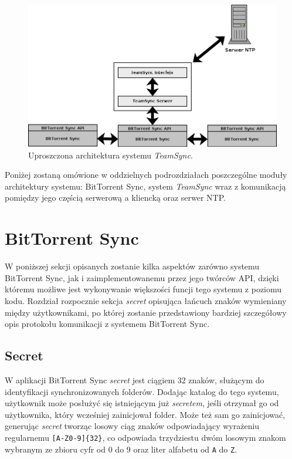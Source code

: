 \documentclass[polish,a4paper,twoside]{ppfcmthesis}
\begin{document}
\begin{figure}[htb]
  \vspace{5pt}
  \begin{center}
    \includegraphics[width=380pt]{figures/architecture3.png}
  \end{center}
  \caption{Uproszczona architektura systemu \emph{TeamSync}.}
  \label{architecturepic}
\end{figure}

Poniżej zostaną omówione w oddzielnych podrozdziałach poszczególne moduły architektury systemu: BitTorrent Sync, system \emph{TeamSync} wraz z komunikacją pomiędzy jego częścią serwerową a kliencką oraz serwer NTP.

\section{BitTorrent Sync}

W poniższej sekcji opisanych zostanie kilka aspektów zarówno systemu BitTorrent Sync, jak i zaimplementowanemu przez jego twórców API, dzięki któremu możliwe jest wykonywanie większości funcji tego systemu z poziomu kodu. Rozdział rozpocznie sekcja \emph{secret} opisująca łańcuch znaków wymieniany między użytkownikami, po której zostanie przedstawiony bardziej szczegółowy opis protokołu komunikacji z systemem BitTorrent Sync.

\subsection{Secret}

\label{secret}

W aplikacji BitTorrent Sync \emph{secret} jest ciągiem $32$ znaków, służącym do identyfikacji synchronizowanych folderów. Dodając katalog do tego systemu, użytkownik może posłużyć się istniejącym już \emph{secretem}, jeśli otrzymał go od użytkownika, który wcześniej zainicjował folder. Może też sam go zainicjować, generując \emph{secret} tworząc losowy ciąg znaków odpowiadający wyrażeniu regularnemu \texttt{[A-Z0-9]\{32\}}, co odpowiada trzydziestu dwóm losowym znakom wybranym ze zbioru cyfr od $0$ do $9$ oraz liter alfabetu od \texttt{A} do \texttt{Z}.
\end{document}
